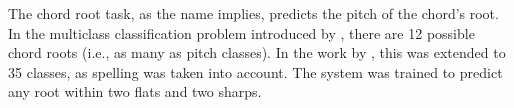 
The chord root task, as the name implies, predicts the pitch
of the chord's root. In the multiclass classification
problem introduced by \textcite{chen2018functional}, there
are 12 possible chord roots (i.e., as many as pitch
classes). In the work by \textcite{micchi2020not}, this was
extended to 35 classes, as spelling was taken into account.
The system was trained to predict any root within two flats
and two sharps. 
